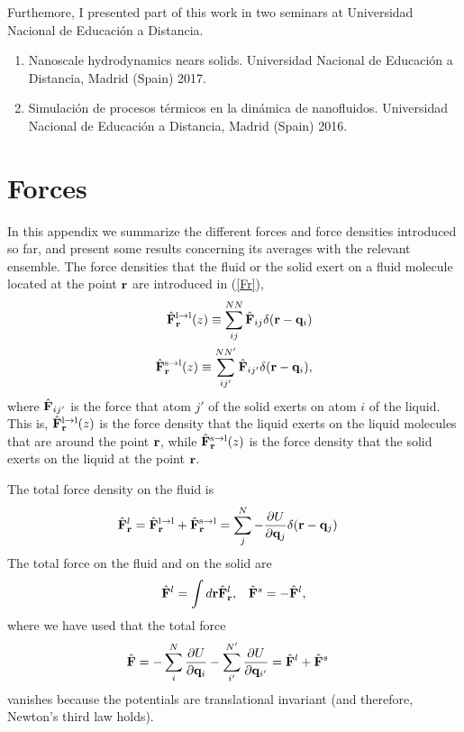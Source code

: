 \documentclass[b5paper,openright,10pt]{book}
\begin{document}
\begin{appendices}
  Furthemore, I presented part of this work in two seminars at Universidad Nacional de Educación a Distancia. 
  \begin{enumerate}
  \item Nanoscale hydrodynamics nears solids. Universidad Nacional de Educación a Distancia, Madrid (Spain) 2017.
              \item Simulación de procesos térmicos en la dinámica de nanofluidos. Universidad Nacional de Educación a Distancia, Madrid (Spain) 2016.
  \end{enumerate}




\chapter{Forces}  
\label{Ap:Forces}
In this appendix we summarize the different forces and force densities
introduced so far, and present  some results  concerning its
averages  with the relevant  ensemble.  The  force densities  that the
fluid or the solid exert on a fluid molecule located at the point ${\bf
  r}$ are introduced in (\ref{Fr}),
\begin{eqnarray}
  \hat{\bf F}^{\rm l\to l}_{\bf r}(z) \equiv \sum^{NN}_{ij}\hat{\bf F}_{ij}\delta({\bf r}-{\bf q}_i)
\nonumber\\
\hat{\bf F}^{\rm s\to l}_{\bf r}(z) \equiv \sum^{NN'}_{ij'}\hat{\bf F}_{ij'}\delta({\bf r}-{\bf q}_i),
\label{Fr_ap}
\end{eqnarray}
where $\hat{\bf  F}_{ij'}$ is the  force that  atom $j'$ of  the solid
exerts on  atom $i$ of  the liquid.   This is, $\hat{\bf  F}^{\rm l\to
  l}_{\bf r}(z) $  is the force density that the  liquid exerts on the
liquid molecules that are around  the point ${\bf r}$, while $\hat{\bf
  F}^{\rm  s\to l}_{\bf  r}(z)$ is  the force  density that  the solid
exerts on the liquid at the point ${\bf r}$.

The total force density on the fluid is
\begin{align}
  \hat{\bf F}^l_{\bf r}&=\hat{\bf F}^{\rm l\to l}_{\bf r}+\hat{\bf F}^{\rm s\to l}_{\bf r} =\sum^{N}_{j}-\frac{\partial U}{\partial {\bf q}_{j}}\delta({\bf r}-{\bf q}_j)
\end{align}
The total force on the fluid and on the solid are
\begin{align}
  \hat{\bf F}^l=\int d{\bf r}\hat{\bf F}^l_{\bf r}, &&
  \hat{\bf F}^s= -\hat{\bf F}^l,
\end{align}
where we have used that the total force
\begin{align}
  \hat{\bf F}&=-\sum^N_{i}\frac{\partial U}{\partial {\bf q}_i}
-\sum^{N'}_{i'}\frac{\partial U}{\partial {\bf q}_{i'}}
=\hat{\bf F}^l+\hat{\bf F}^s
\end{align}
 vanishes because the  potentials are translational invariant (and
therefore, Newton's third law holds).


\end{appendices}
\end{document}
